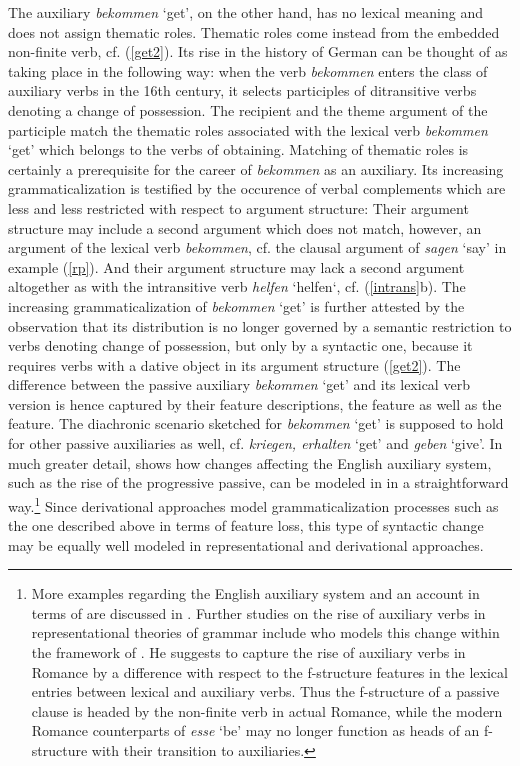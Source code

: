 \documentclass[output=paper
	        ,collection
	        ,collectionchapter
 	        ,biblatex
                ,babelshorthands
                ,newtxmath
                ,draftmode
                ,colorlinks, citecolor=brown
]{./langsci/langscibook}
\begin{document}
The auxiliary \textit{bekommen} `get', on the other hand, has no lexical meaning and does not assign thematic roles. Thematic roles come instead from the embedded non-finite verb, cf. (\ref{get2}). Its rise in the history of German can be thought of as taking place in the following way: when the verb \textit{bekommen} enters the class of auxiliary verbs in the 16th century, it selects participles of ditransitive verbs denoting a change of possession. The recipient and the theme argument of the participle match the thematic roles associated with the lexical verb \textit{bekommen} `get' which belongs to the verbs of obtaining. Matching of thematic roles is certainly a prerequisite for the career of \textit{bekommen} as an auxiliary. Its increasing grammaticalization is testified by the occurence of verbal complements which are less and less restricted with respect to argument structure: Their argument structure may include a second argument which does not match, however, an argument of the lexical verb \textit{bekommen}, cf. the clausal argument of \textit{sagen} `say' in example (\ref{rp}). And their argument structure may lack a second argument altogether as with the intransitive verb \textit{helfen} `helfen`, cf. (\ref{intrans}b). The increasing grammaticalization of \textit{bekommen} `get' is further attested by the observation that its distribution is no longer governed by a semantic restriction to verbs denoting change of possession, but only by a syntactic one, because it requires verbs with a dative object in its argument structure (\ref{get2}). The difference between the passive auxiliary \textit{bekommen} `get' and its lexical verb version is hence captured by their feature descriptions, \ie the \cat feature as well as the \content feature. The diachronic scenario sketched for \textit{bekommen} `get' is supposed to hold for other passive auxiliaries as well, cf. \textit{kriegen, erhalten} `get' and \textit{geben} `give'. In much greater detail, \cite{warner1995} shows how changes affecting the English auxiliary system, such as the rise of the progressive passive, can be modeled in \hpsg in a straightforward way.\footnote{More examples regarding the English auxiliary system and an account in terms of \hpsg are discussed in \cite{warner1993}. Further studies on the rise of auxiliary verbs in representational theories of grammar include \cite{schwarze2001} who models this change within the framework of \lfg. He suggests to capture the rise of auxiliary verbs in Romance by a difference with respect to the f-structure features in the lexical entries between lexical and auxiliary verbs. Thus the f-structure of a passive clause is headed by the non-finite verb in actual Romance, while the modern Romance counterparts of  \textit{esse} `be' may no longer function as heads of an f-structure with their transition to auxiliaries.} Since derivational approaches model grammaticalization processes such as the one described above in terms of feature loss, this type of syntactic change may be equally well modeled in representational and derivational approaches.
\end{document}
